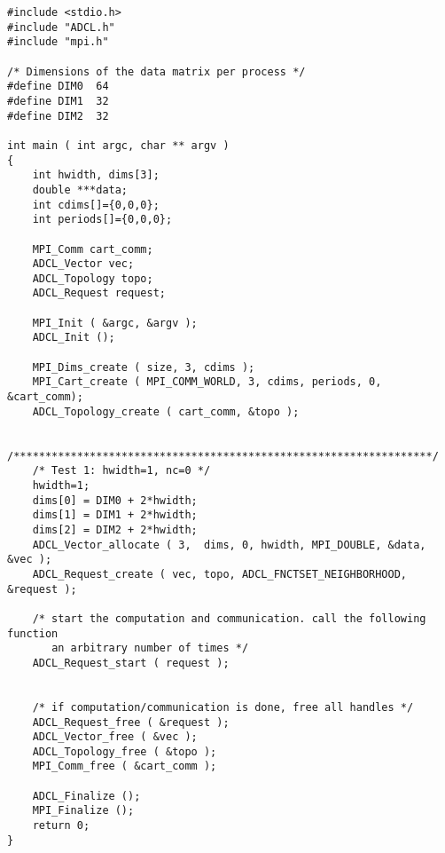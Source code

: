 \begin{verbatim}
#include <stdio.h>
#include "ADCL.h"
#include "mpi.h"

/* Dimensions of the data matrix per process */
#define DIM0  64
#define DIM1  32
#define DIM2  32

int main ( int argc, char ** argv ) 
{
    int hwidth, dims[3];
    double ***data;
    int cdims[]={0,0,0};
    int periods[]={0,0,0};
    
    MPI_Comm cart_comm;
    ADCL_Vector vec;
    ADCL_Topology topo;
    ADCL_Request request;

    MPI_Init ( &argc, &argv );
    ADCL_Init ();
    
    MPI_Dims_create ( size, 3, cdims );
    MPI_Cart_create ( MPI_COMM_WORLD, 3, cdims, periods, 0, &cart_comm);
    ADCL_Topology_create ( cart_comm, &topo );

    /******************************************************************/
    /* Test 1: hwidth=1, nc=0 */
    hwidth=1;
    dims[0] = DIM0 + 2*hwidth;
    dims[1] = DIM1 + 2*hwidth;
    dims[2] = DIM2 + 2*hwidth;
    ADCL_Vector_allocate ( 3,  dims, 0, hwidth, MPI_DOUBLE, &data, &vec );
    ADCL_Request_create ( vec, topo, ADCL_FNCTSET_NEIGHBORHOOD, &request );
    
    /* start the computation and communication. call the following function
       an arbitrary number of times */ 
    ADCL_Request_start ( request );


    /* if computation/communication is done, free all handles */
    ADCL_Request_free ( &request );
    ADCL_Vector_free ( &vec );
    ADCL_Topology_free ( &topo );
    MPI_Comm_free ( &cart_comm );
    
    ADCL_Finalize ();
    MPI_Finalize ();
    return 0;
}
\end{verbatim}
